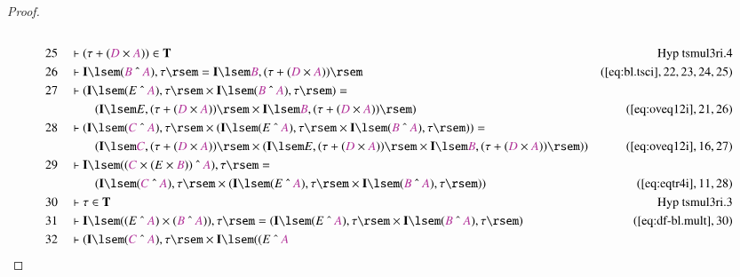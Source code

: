 \begin{proof}
\begin{align}
  \\ 25 &&  & \vdash ( \tau + ( \mc{D} \times \mc{A} ) ) \in
      \mathbf{T}&\text{Hyp~tsmul3ri.4}\notag%
  \\ 26 &&  & \vdash \mathbf{I} \lsem ( \mc{B} ~\string^~ \mc{A} ) , \tau \rsem
      = \mathbf{I} \lsem \mc{B} , ( \tau + ( \mc{D} \times
      \mc{A} ) )
      \rsem&(\mbox{\ref{eq:bl.tsci}},22,23,24,25)\notag
  \\ 27 &&  & \vdash ( \mathbf{I} \lsem ( E ~\string^~ \mc{A} ) , \tau \rsem
      \times \mathbf{I} \lsem ( \mc{B} ~\string^~ \mc{A} ) ,
      \tau \rsem ) =  \notag \\ & & & \qquad
     ( \mathbf{I} \lsem E , ( \tau + (
      \mc{D} \times \mc{A} ) ) \rsem \times \mathbf{I} \lsem
      \mc{B} , ( \tau + ( \mc{D} \times \mc{A} ) ) \rsem
      )&(\mbox{\ref{eq:oveq12i}},21,26)\notag
  \\ 28 &&  & \vdash ( \mathbf{I} \lsem ( \mc{C} ~\string^~ \mc{A} ) , \tau
      \rsem \times ( \mathbf{I} \lsem ( E ~\string^~ \mc{A}
      ) , \tau \rsem \times \mathbf{I} \lsem ( \mc{B}
      ~\string^~ \mc{A} ) , \tau \rsem ) ) =  \notag \\ & & & \qquad
     ( \mathbf{I}
      \lsem \mc{C} , ( \tau + ( \mc{D} \times \mc{A} ) )
      \rsem \times ( \mathbf{I} \lsem E , ( \tau + ( \mc{D}
      \times \mc{A} ) ) \rsem \times \mathbf{I} \lsem \mc{B}
      , ( \tau + ( \mc{D} \times \mc{A} ) ) \rsem )
      )&(\mbox{\ref{eq:oveq12i}},16,27)\notag
  \\ 29 &&  & \vdash \mathbf{I} \lsem ( ( \mc{C} \times ( E \times \mc{B} ) )
      ~\string^~ \mc{A} ) , \tau \rsem =  \notag \\ & & & \qquad
     ( \mathbf{I} \lsem
      ( \mc{C} ~\string^~ \mc{A} ) , \tau \rsem \times (
      \mathbf{I} \lsem ( E ~\string^~ \mc{A} ) , \tau \rsem
      \times \mathbf{I} \lsem ( \mc{B} ~\string^~ \mc{A} ) ,
      \tau \rsem ) )&(\mbox{\ref{eq:eqtr4i}},11,28)\notag
  \\ 30 &&  & \vdash \tau \in
      \mathbf{T}&\text{Hyp~tsmul3ri.3}\notag%
  \\ 31 &&  & \vdash \mathbf{I} \lsem ( ( E ~\string^~ \mc{A} ) \times ( \mc{B}
      ~\string^~ \mc{A} ) ) , \tau \rsem = ( \mathbf{I}
      \lsem ( E ~\string^~ \mc{A} ) , \tau \rsem \times
      \mathbf{I} \lsem ( \mc{B} ~\string^~ \mc{A} ) , \tau
      \rsem )&(\mbox{\ref{eq:df-bl.mult}},30)\notag
  \\ 32 &&  & \vdash ( \mathbf{I} \lsem ( \mc{C} ~\string^~ \mc{A} ) , \tau
      \rsem \times \mathbf{I} \lsem ( ( E ~\string^~ \mc{A}

\end{align}
\end{proof}
